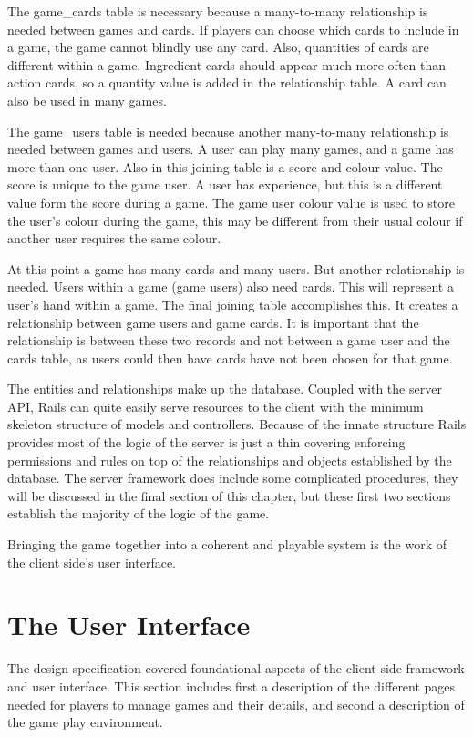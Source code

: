 The game\_cards table is necessary because a many-to-many relationship is needed between games and cards. If players can choose which cards to include in a game, the game cannot blindly use any card. Also, quantities of cards are different within a game. Ingredient cards should appear much more often than action cards, so a quantity value is added in the relationship table. A card can also be used in many games.

The game\_users table is needed because another many-to-many relationship is needed between games and users. A user can play many games, and a game has more than one user. Also in this joining table is a score and colour value. The score is unique to the game user. A user has experience, but this is a different value form the score during a game. The game user colour value is used to store the user's colour during the game, this may be different from their usual colour if another user requires the same colour.

At this point a game has many cards and many users. But another relationship is needed. Users within a game (game users) also need cards. This will represent a user's hand within a game. The final joining table accomplishes this. It creates a relationship between game users and game cards. It is important that the relationship is between these two records and not between a game user and the cards table, as users could then have cards have not been chosen for that game.

The entities and relationships make up the database. Coupled with the server API, Rails can quite easily serve resources to the client with the minimum skeleton structure of models and controllers. Because of the innate structure Rails provides most of the logic of the server is just a thin covering enforcing permissions and rules on top of the relationships and objects established by the database. The server framework does include some complicated procedures, they will be discussed in the final section of this chapter, but these first two sections establish the majority of the logic of the game. 

Bringing the game together into a coherent and playable system is the work of the client side's user interface.

\section{The User Interface}
The design specification covered foundational aspects of the client side framework and user interface. This section includes first a description of the different pages needed for players to manage games and their details, and second a description of the game play environment.

